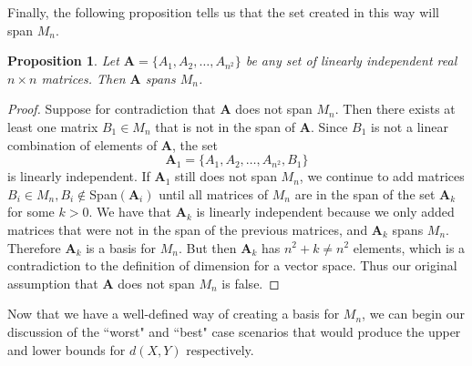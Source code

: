 \documentclass[11pt]{amsart}
\newtheorem{proposition}[theorem]{Proposition}
\numberwithin{equation}{section}
\numberwithin{figure}{section}
\numberwithin{theorem}{section}
\begin{document}
Finally, the following proposition tells us that the set created in this way will span $M_n$.  
\begin{proposition}
Let $\textbf{A}=\{A_1,A_2,\ldots,A_{n^2}\}$ be any set of linearly independent real $n\times n$ matrices. Then $\textbf{A}$ spans $M_n$. 
\end{proposition}
\begin{proof}
Suppose for contradiction that $\textbf{A}$ does not span $M_n$. Then there exists at least one matrix $B_1\in M_n$ that is not in the span of $\textbf{A}$. Since $B_1$ is not a linear combination of elements of $\textbf{A}$, the set $$\textbf{A}_1=\{A_1,A_2,\ldots,A_{n^2},B_1\}$$ is linearly independent. If $\textbf{A}_1$ still does not span $M_n$, we continue to add matrices $B_i\in M_n, B_i\notin$Span$(\textbf{A}_i)$ until all matrices of $M_n$ are in the span of the set $\textbf{A}_k$ for some $k>0$. We have that $\textbf{A}_k$ is linearly independent because we only added matrices that were not in the span of the previous matrices, and $\textbf{A}_k$ spans $M_n$. Therefore $\textbf{A}_k$ is a basis for $M_n$. But then $\textbf{A}_k$ has $n^2+k\neq n^2$ elements, which is a contradiction to the definition of dimension for a vector space. Thus our original assumption that $\textbf{A}$ does not span $M_n$ is false. 
\end{proof}
Now that we have a well-defined way of creating a basis for $M_n$, we can begin our discussion of the ``worst" and ``best" case scenarios that would produce the upper and lower bounds for $d(X,Y)$ respectively. 
\end{document}
